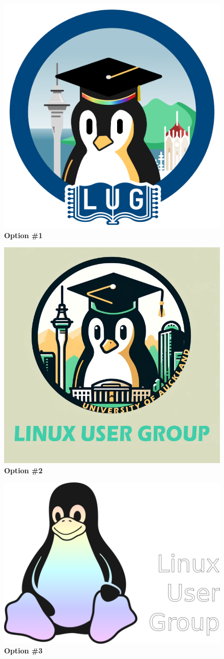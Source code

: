 \documentclass[11pt,fleqn]{article}
\begin{document}
\newpage


\begin{figure}
  \centering
  \includegraphics[width=0.56\linewidth]{res/1.png}
  \caption*{\Large{\textbf{Option \#1}}}
  \label{fig:optn1}
\end{figure}

\begin{figure}
  \centering
  \includegraphics[width=0.56\linewidth]{res/2.png}
  \caption*{\Large{\textbf{Option \#2}}}
  \label{fig:optn2}
\end{figure}

\begin{figure}
  \centering
  \includegraphics[width=0.56\linewidth]{res/3-initial-lug-logo.png}
  \caption*{\Large{\textbf{Option \#3}}}
  \label{fig:optn3}
\end{figure}
\end{document}
